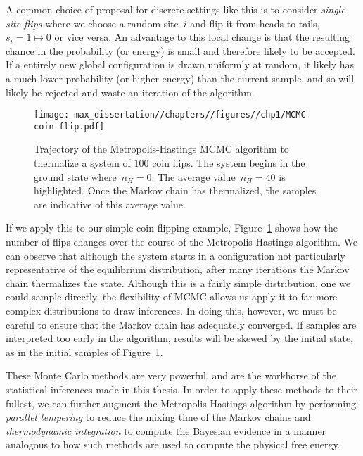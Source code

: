 A common choice of proposal for discrete settings like this is to consider \emph{single site flips} where we choose a random site~$i$ and flip it from heads to tails, $s_i = 1 \mapsto 0$  or vice versa. An advantage to this local change is that the resulting chance in the probability (or energy) is small and therefore likely to be accepted. If a entirely new global configuration is drawn uniformly at random, it likely has a much lower probability (or higher energy) than the current sample, and so will likely be rejected and waste an iteration of the algorithm.

\begin{figure}
    \centering
    \texttt{[image: max\_dissertation//chapters//figures//chp1/MCMC-coin-flip.pdf]}
    \caption{Trajectory of the Metropolis-Hastings MCMC algorithm to thermalize a system of 100 coin flips. The system begins in the ground state where~$n_H = 0$. The average value~$n_H = 40$ is highlighted. Once the Markov chain has thermalized, the samples are indicative of this average value.}
    \label{fig:MCMC-coin-flip}
\end{figure}

If we apply this to our simple coin flipping example, Figure~\ref{fig:MCMC-coin-flip} shows how the number of flips changes over the course of the Metropolis-Hastings algorithm. We can observe that although the system starts in a configuration not particularly representative of the equilibrium distribution, after many iterations the Markov chain thermalizes the state. Although this is a fairly simple distribution, one we could sample directly, the flexibility of MCMC allows us apply it to far more complex distributions to draw inferences. In doing this, however, we must be careful to ensure that the Markov chain has adequately converged. If samples are interpreted too early in the algorithm, results will be skewed by the initial state, as in the initial samples of Figure~\ref{fig:MCMC-coin-flip}.

These Monte Carlo methods are very powerful, and are the workhorse of the statistical inferences made in this thesis. In order to apply these methods to their fullest, we can further augment the Metropolis-Hastings algorithm by performing \emph{parallel tempering} to reduce the mixing time of the Markov chains and \emph{thermodynamic integration} to compute the Bayesian evidence in a manner analogous to how such methods are used to compute the physical free energy. 